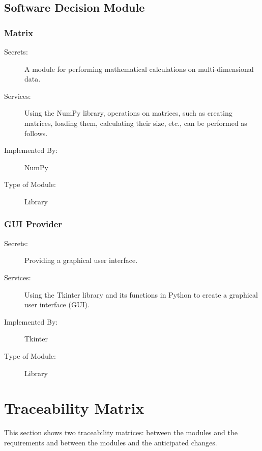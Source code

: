 \documentclass[12pt, titlepage]{article}
\begin{document}
\subsection{Software Decision Module}

\subsubsection{Matrix}
\begin{description}
\item[Secrets:] A module for performing mathematical calculations on multi-dimensional data.
\item[Services:] Using the NumPy library, operations on matrices, such as creating matrices, loading them, calculating their size, etc., can be performed as follows.
\item[Implemented By:] NumPy
\item[Type of Module:] Library
\end{description}

\subsubsection{GUI Provider}
\begin{description}
\item[Secrets:] Providing a graphical user interface.
\item[Services:] Using the Tkinter library and its functions in Python to create a graphical user interface (GUI).
\item[Implemented By:] Tkinter
\item[Type of Module:] Library
\end{description}
\section{Traceability Matrix} \label{SecTM}

This section shows two traceability matrices: between the modules and the
requirements and between the modules and the anticipated changes.
\end{document}
